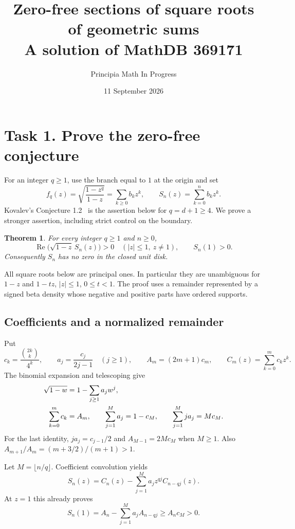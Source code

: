 \documentclass[11pt]{article}
\title{Zero-free sections of square roots of geometric sums\\
\large A solution of MathDB 369171}
\author{Principia Math In Progress}
\date{11 September 2026}
\newtheorem{theorem}{Theorem}
\newcommand{\Rea}{\operatorname{Re}}
\begin{document}
\maketitle

\section*{Task 1. Prove the zero-free conjecture}

For an integer $q\geq1$, use the branch equal to $1$ at the origin and set
\[
 f_q(z)=\sqrt{\frac{1-z^q}{1-z}}
       =\sum_{k\geq0}b_kz^k,\qquad
 S_n(z)=\sum_{k=0}^n b_kz^k.
\]
Kovalev's Conjecture 1.2~\cite{K} is the assertion below for $q=d+1\geq4$.
We prove a stronger assertion, including strict control on the boundary.

\begin{theorem}\label{thm:main}
For every integer $q\geq1$ and $n\geq0$,
\[
 \Rea\bigl(\sqrt{1-z}\,S_n(z)\bigr)>0
 \quad (|z|\leq1,\ z\ne1),
 \qquad S_n(1)>0.
\]
Consequently $S_n$ has no zero in the closed unit disk.
\end{theorem}

All square roots below are principal ones. In particular they are
unambiguous for $1-z$ and $1-tz$, $|z|\leq1$, $0\leq t<1$.
The proof uses a remainder represented by a signed beta density whose
negative and positive parts have ordered supports.

\subsection*{Coefficients and a normalized remainder}

Put
\[
 c_k=\frac{\binom{2k}{k}}{4^k},\qquad
 a_j=\frac{c_j}{2j-1}\quad(j\geq1),\qquad
 A_m=(2m+1)c_m,\qquad C_m(z)=\sum_{k=0}^m c_kz^k.
\]
The binomial expansion and telescoping give
\begin{align}
 \sqrt{1-w}&=1-\sum_{j\geq1}a_jw^j, \notag\\
 \sum_{k=0}^m c_k&=A_m,\qquad
 \sum_{j=1}^M a_j=1-c_M,\qquad
 \sum_{j=1}^M ja_j=M c_M. \label{eq:sums}
\end{align}
For the last identity, $ja_j=c_{j-1}/2$ and
$A_{M-1}=2Mc_M$ when $M\geq1$.
Also $A_{m+1}/A_m=(m+3/2)/(m+1)>1$.

Let $M=\lfloor n/q\rfloor$. Coefficient convolution yields
\begin{equation}
 S_n(z)=C_n(z)-\sum_{j=1}^M a_j z^{qj} C_{n-qj}(z).
 \label{eq:section}
\end{equation}
At $z=1$ this already proves
\begin{equation}
 S_n(1)=A_n-\sum_{j=1}^M a_j A_{n-qj}
       \geq A_n c_M>0. \label{eq:one}
\end{equation}
\end{document}
